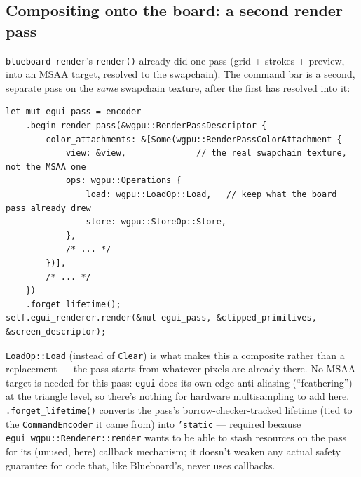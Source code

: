 \documentclass[11pt]{article}
\begin{document}
\subsection{Compositing onto the board: a second render pass}
\texttt{blueboard-render}'s \texttt{render()} already did one pass (grid + strokes +
preview, into an MSAA target, resolved to the swapchain). The command bar is a second,
separate pass on the \emph{same} swapchain texture, after the first has resolved into it:
\begin{lstlisting}
let mut egui_pass = encoder
    .begin_render_pass(&wgpu::RenderPassDescriptor {
        color_attachments: &[Some(wgpu::RenderPassColorAttachment {
            view: &view,              // the real swapchain texture, not the MSAA one
            ops: wgpu::Operations {
                load: wgpu::LoadOp::Load,   // keep what the board pass already drew
                store: wgpu::StoreOp::Store,
            },
            /* ... */
        })],
        /* ... */
    })
    .forget_lifetime();
self.egui_renderer.render(&mut egui_pass, &clipped_primitives, &screen_descriptor);
\end{lstlisting}
\texttt{LoadOp::Load} (instead of \texttt{Clear}) is what makes this a composite rather
than a replacement — the pass starts from whatever pixels are already there. No MSAA
target is needed for this pass: \texttt{egui} does its own edge anti-aliasing
(``feathering'') at the triangle level, so there's nothing for hardware multisampling to
add here. \texttt{.forget\_lifetime()} converts the pass's borrow-checker-tracked lifetime
(tied to the \texttt{CommandEncoder} it came from) into \texttt{'static} — required because
\texttt{egui\_wgpu::Renderer::render} wants to be able to stash resources on the pass for
its (unused, here) callback mechanism; it doesn't weaken any actual safety guarantee for
code that, like Blueboard's, never uses callbacks.
\end{document}
